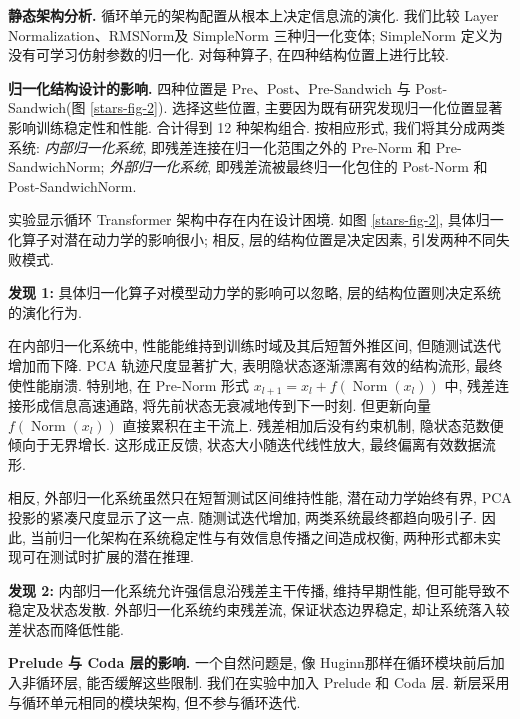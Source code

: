 \noindent\textbf{静态架构分析.}\label{stars-sec-4-2}
循环单元的架构配置从根本上决定信息流的演化. 我们比较 Layer Normalization\cite{stars-ba2016layer}、RMSNorm\cite{stars-zhang2019root}及 SimpleNorm 三种归一化变体; SimpleNorm 定义为没有可学习仿射参数的归一化. 对每种算子, 在四种结构位置上进行比较.

\noindent\textbf{归一化结构设计的影响.}
四种位置是 Pre、Post、Pre-Sandwich 与 Post-Sandwich(图 \ref{stars-fig-2}). 选择这些位置, 主要因为既有研究发现归一化位置显著影响训练稳定性和性能\cite{stars-xiong2020layer,stars-bai2021stabilizing}. 合计得到 12 种架构组合. 按相应形式, 我们将其分成两类系统: \emph{内部归一化系统}, 即残差连接在归一化范围之外的 Pre-Norm 和 Pre-SandwichNorm; \emph{外部归一化系统}, 即残差流被最终归一化包住的 Post-Norm 和 Post-SandwichNorm.

实验显示循环 Transformer 架构中存在内在设计困境. 如图 \ref{stars-fig-2}, 具体归一化算子对潜在动力学的影响很小; 相反, 层的结构位置是决定因素, 引发两种不同失败模式.
\begin{remark}
\textbf{发现 1:} 具体归一化算子对模型动力学的影响可以忽略, 层的结构位置则决定系统的演化行为.
\end{remark}

在内部归一化系统中, 性能能维持到训练时域及其后短暂外推区间, 但随测试迭代增加而下降. PCA 轨迹尺度显著扩大, 表明隐状态逐渐漂离有效的结构流形, 最终使性能崩溃. 特别地, 在 Pre-Norm 形式 $x_{l+1}=x_l+f(\operatorname{Norm}(x_l))$ 中, 残差连接形成信息高速通路\cite{stars-he2016deep}, 将先前状态无衰减地传到下一时刻. 但更新向量 $f(\operatorname{Norm}(x_l))$ 直接累积在主干流上. 残差相加后没有约束机制, 隐状态范数便倾向于无界增长. 这形成正反馈, 状态大小随迭代线性放大, 最终偏离有效数据流形.

相反, 外部归一化系统虽然只在短暂测试区间维持性能, 潜在动力学始终有界, PCA 投影的紧凑尺度显示了这一点. 随测试迭代增加, 两类系统最终都趋向吸引子. 因此, 当前归一化架构在系统稳定性与有效信息传播之间造成权衡, 两种形式都未实现可在测试时扩展的潜在推理.
\begin{remark}
\textbf{发现 2:} 内部归一化系统允许强信息沿残差主干传播, 维持早期性能, 但可能导致不稳定及状态发散. 外部归一化系统约束残差流, 保证状态边界稳定, 却让系统落入较差状态而降低性能.
\end{remark}

\noindent\textbf{Prelude 与 Coda 层的影响.}
一个自然问题是, 像 Huginn\cite{stars-geiping2025scaling}那样在循环模块前后加入非循环层, 能否缓解这些限制. 我们在实验中加入 Prelude 和 Coda 层. 新层采用与循环单元相同的模块架构, 但不参与循环迭代.

